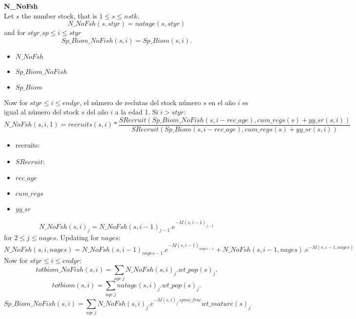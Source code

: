\documentclass{article}
\begin{document}
\textbf{N\_NoFsh}\\
Let $s$ the number stock,  that is $1\leq s \leq nstk$.
\begin{equation}
N\_NoFsh(s,styr)=natage(s,styr)
\end{equation}
and for $styr\_sp \leq i \leq styr$ 
\begin{equation}
    Sp\_Biom\_NoFish(s,i)=Sp\_Biom(s,i).
\end{equation}
\begin{itemize}
    \item $N\_NoFsh$
    \item $Sp\_Biom\_NoFish$
    \item $Sp\_Biom$
\end{itemize}
Now for $styr\leq i \leq endyr$, el número de reclutas del stock número $s$ en el año $i$  es igual al número del stock $s$ del año $i$ a la edad 1. Si $i>styr$:
\begin{equation}
    N\_NoFsh(s,i,1)=recruits(s,i)*\dfrac{SRecruit(Sp\_Biom\_NoFish(s,i-rec\_age),cum\_regs(s)+yy\_sr(s,i))}{SRecruit(Sp\_Biom(s,i-rec\_age),cum\_regs(s)+yy\_sr(s,i))}
\end{equation}
\begin{itemize}
    \item recruits:
    \item $SRecruit$:
    \item $rec\_age$
    \item $cum\_regs$
    \item $yy\_sr$
\end{itemize}
\begin{equation}
    N\_NoFsh(s,i)_j=N\_NoFsh(s,i-1)_{j-1}.e^{-M(s,i-1)_{j-1}}
\end{equation}
for $2\leq j \leq nages.$ Updating for $nages$:
\begin{equation}
    N\_NoFsh(s,i,nages)=N\_NoFsh(s,i-1)_{nages-1}.e^{-M(s,i-1)_{nages-1}}+N\_NoFsh(s,i-1,nages).e^{-M(s,i-1,nages)}
\end{equation}
Now for $ styr\leq i \leq endyr$:
\begin{equation}
    totbiom\_NoFish(s,i)=\sum_{age \ j}N\_NoFsh(s,i)_j.wt\_pop(s)_j.
\end{equation}
\begin{equation}
    totbiom(s,i)=\sum_{age \ j}natage(s,i)_j.wt\_pop(s)_j.
\end{equation}
\begin{equation}
Sp\_Biom\_NoFish(s,i)=\sum_{age \ j} N\_NoFsh(s,i)_j.e^{-M(s,i)_j.spmo\_frac}wt\_mature(s)_j
\end{equation}
\end{document}
